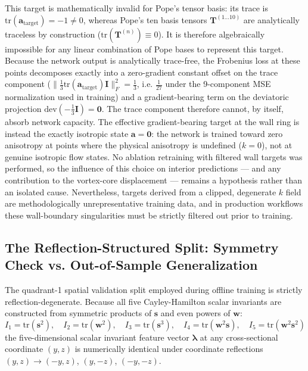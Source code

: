 \documentclass[11pt,a4paper]{article}
\begin{document}
This target is mathematically invalid for Pope's tensor basis: its trace is $\mathrm{tr}(\mathbf{a}_{\text{target}}) = -1 \ne 0$, whereas Pope's ten basis tensors $\mathbf{T}^{(1 \dots 10)}$ are analytically traceless by construction ($\mathrm{tr}(\mathbf{T}^{(n)}) \equiv 0$). It is therefore algebraically impossible for any linear combination of Pope bases to represent this target. Because the network output is analytically trace-free, the Frobenius loss at these points decomposes exactly into a zero-gradient constant offset on the trace component ($\|\frac{1}{3}\mathrm{tr}(\mathbf{a}_{\text{target}})\mathbf{I}\|_F^2 = \frac{1}{3}$, i.e. $\frac{1}{27}$ under the 9-component MSE normalization used in training) and a gradient-bearing term on the deviatoric projection $\mathrm{dev}(-\frac{1}{3}\mathbf{I}) = \mathbf{0}$. The trace component therefore cannot, by itself, absorb network capacity. The effective gradient-bearing target at the wall ring is instead the exactly isotropic state $\mathbf{a} = \mathbf{0}$: the network is trained toward zero anisotropy at points where the physical anisotropy is undefined ($k = 0$), not at genuine isotropic flow states. No ablation retraining with filtered wall targets was performed, so the influence of this choice on interior predictions --- and any contribution to the vortex-core displacement --- remains a hypothesis rather than an isolated cause. Nevertheless, targets derived from a clipped, degenerate $k$ field are methodologically unrepresentative training data, and in production workflows these wall-boundary singularities must be strictly filtered out prior to training.

\subsection{The Reflection-Structured Split: Symmetry Check vs. Out-of-Sample Generalization}
The quadrant-1 spatial validation split employed during offline training is strictly reflection-degenerate. Because all five Cayley-Hamilton scalar invariants are constructed from symmetric products of $\mathbf{s}$ and even powers of $\mathbf{w}$:
\begin{equation}
I_1 = \mathrm{tr}(\mathbf{s}^2), \quad I_2 = \mathrm{tr}(\mathbf{w}^2), \quad I_3 = \mathrm{tr}(\mathbf{s}^3), \quad I_4 = \mathrm{tr}(\mathbf{w}^2\mathbf{s}), \quad I_5 = \mathrm{tr}(\mathbf{w}^2\mathbf{s}^2)
\end{equation}
the five-dimensional scalar invariant feature vector $\boldsymbol{\lambda}$ at any cross-sectional coordinate $(y, z)$ is numerically identical under coordinate reflections $(y, z) \to (-y, z)$, $(y, -z)$, $(-y, -z)$.
\end{document}
